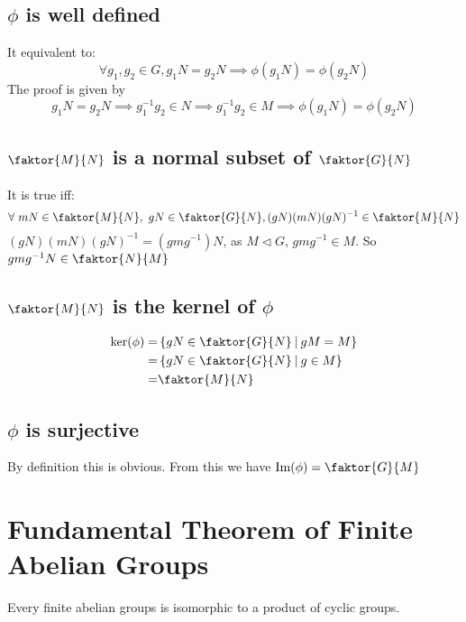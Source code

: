 \documentclass{article}
\renewcommand{\Im}{\text{Im}}
\begin{document}
	\subsection*{$\phi$ is well defined}
	It equivalent to:$$
	\forall g_1,g_2\in G, g_1N=g_2N\implies \phi(g_1N)=\phi(g_2N)$$
	The proof is given by$$
	 g_1N=g_2N\implies g_1^{-1}g_2\in N\implies g_1^{-1}g_2\in M\implies \phi(g_1N)=\phi(g_2N)
	$$
	\subsection*{$\faktor{M}{N}$ is a normal subset of $\faktor{G}{N}$}
	It is true iff:\\
	$$\forall\ mN \in\faktor{M}{N},\ gN \in\faktor{G}{N}, (gN)(mN)(gN)^{-1}\in\faktor{M}{N}$$
	$(gN)(mN)(gN)^{-1}=(gmg^{-1})N$, as $M\triangleleft G$, $gmg^{-1}\in M$. So $gmg^{-1}N\in\faktor{N}{M}$
	\subsection*{$\faktor{M}{N}$ is the kernel of $\phi$}
	\begin{align*}
		\ker(\phi) =& \left\{gN\in\faktor{G}{N}\ \vline\ gM=M \right\}\\
				   =& \left\{gN\in\faktor{G}{N}\ \vline\ g\in M \right\}\\
				   =& \faktor{M}{N}
	\end{align*}
	\subsection*{$\phi$ is surjective}
	By definition this is obvious. From this we have $\Im(\phi)=\faktor{G}{M}$
	
	\section*{Fundamental Theorem of Finite Abelian Groups}
		Every finite abelian groups is isomorphic to a product of cyclic groups.
\end{document}
